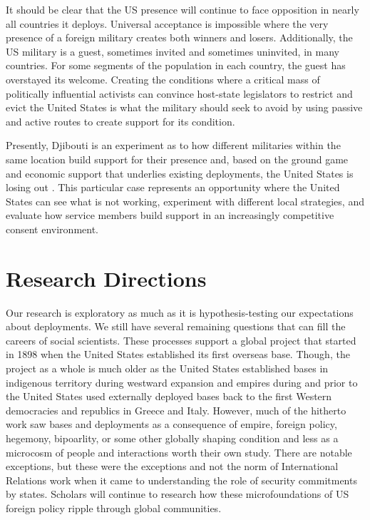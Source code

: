 It should be clear that the US presence will continue to face opposition in nearly all countries it deploys. Universal acceptance is impossible where the very presence of a foreign military creates both winners and losers. Additionally, the US military is a guest, sometimes invited and sometimes uninvited, in many countries. For some segments of the population in each country, the guest has overstayed its welcome. Creating the conditions where a critical mass of politically influential activists can convince host-state legislators to restrict and evict the United States is what the military should seek to avoid by using passive and active routes to create support for its condition. 

Presently, Djibouti is an experiment as to how different militaries within the same location build support for their presence and, based on the ground game and economic support that underlies existing deployments, the United States is losing out \cite{Bearak2019}. This particular case represents an opportunity where the United States can see what is not working, experiment with different local strategies, and evaluate how service members build support in an increasingly competitive consent environment. 

\section*{Research Directions}

Our research is exploratory as much as it is hypothesis-testing our expectations about deployments. We still have several remaining questions that can fill the careers of social scientists. These processes support a global project that started in 1898 when the United States established its first overseas base. Though, the project as a whole is much older as the United States established bases in indigenous territory during westward expansion and empires during and prior to the United States used externally deployed bases back to the first Western democracies and republics in Greece and Italy. However, much of the hitherto work saw bases and deployments as a consequence of empire, foreign policy, hegemony, bipoarlity, or some other globally shaping condition and less as a microcosm of people and interactions worth their own study. There are notable exceptions, but these were the exceptions and not the norm of International Relations work when it came to understanding the role of security commitments by states. Scholars will continue to research how these microfoundations of US foreign policy ripple through global communities.

